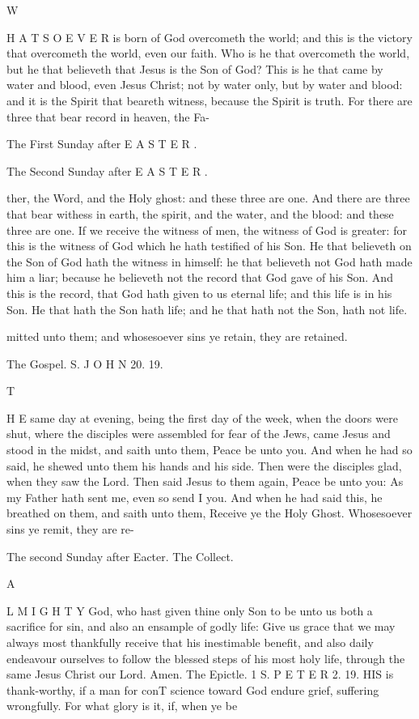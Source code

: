 W

H A T S O E V E R is born of God overcometh the world; and this is the victory that overcometh the world, even our faith. Who is he that overcometh the world, but he that believeth that Jesus is the Son of God? This is he that came by water and blood, even Jesus Christ; not by water only, but by water and blood: and it is the Spirit that beareth witness, because the Spirit is truth. For there are three that bear record in heaven, the Fa-

The First Sunday after E A S T E R .

The Second Sunday after E A S T E R .

ther, the Word, and the Holy ghost: and these three are one. And there are three that bear withess in earth, the spirit, and the water, and the blood: and these three are one. If we receive the witness of men, the witness of God is greater: for this is the witness of God which he hath testified of his Son. He that believeth on the Son of God hath the witness in himself: he that believeth not God hath made him a liar; because he believeth not the record that God gave of his Son. And this is the record, that God hath given to us eternal life; and this life is in his Son. He that hath the Son hath life; and he that hath not the Son, hath not life.

mitted unto them; and whosesoever sins ye retain, they are retained.

The Gospel. S. J O H N 20. 19.

T

H E same day at evening, being the first day of the week, when the doors were shut, where the disciples were assembled for fear of the Jews, came Jesus and stood in the midst, and saith unto them, Peace be unto you. And when he had so said, he shewed unto them his hands and his side. Then were the disciples glad, when they saw the Lord. Then said Jesus to them again, Peace be unto you: As my Father hath sent me, even so send I you. And when he had said this, he breathed on them, and saith unto them, Receive ye the Holy Ghost. Whosesoever sins ye remit, they are re-

The second Sunday after Eacter. The Collect.

A

L M I G H T Y God, who hast given thine only Son to be unto us both a sacrifice for sin, and also an ensample of godly life: Give us grace that we may always most thankfully receive that his inestimable benefit, and also daily endeavour ourselves to follow the blessed steps of his most holy life, through the same Jesus Christ our Lord. Amen. The Epictle. 1 S. P E T E R 2. 19. HIS is thank-worthy, if a man for conT science toward God endure grief, suffering wrongfully. For what glory is it, if, when ye be

